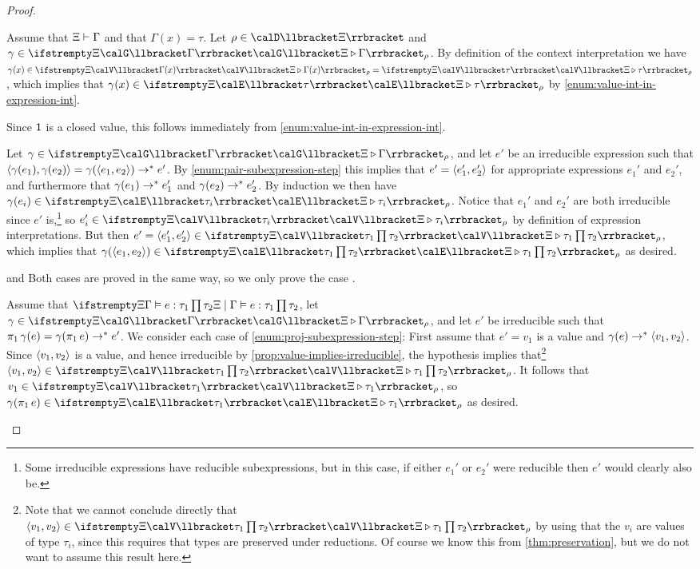 \begin{proof}
\begin{proofsec*}
    \item[\ruleref{Tvar}]
    Assume that $\Xi \vdash \Gamma$ and that $\Gamma(x) = \tau$. Let $\rho \in \tvarInt{\Xi}$ and $\gamma \in \conInt{\Xi}{\Gamma}{\rho}$. By definition of the context interpretation we have $\gamma(x) \in \valInt{\Xi}{\Gamma(x)}{\rho} = \valInt{\Xi}{\tau}{\rho}$, which implies that $\gamma(x) \in \expInt{\Xi}{\tau}{\rho}$ by \cref{enum:value-int-in-expression-int}.

    \item[\ruleref{Tunit}]
    Since $\mathsf{1}$ is a closed value, this follows immediately from \cref{enum:value-int-in-expression-int}.

    \item[\ruleref{Tpair}]
    Let $\gamma \in \conInt{\Xi}{\Gamma}{\rho}$, and let $e'$ be an irreducible expression such that $\langle\textcolor{black}{\gamma(e_1)},\textcolor{black}{\gamma(e_2)}\rangle = \gamma(\langle\textcolor{black}{e_1},\textcolor{black}{e_2}\rangle) \to^* e'$. By \cref{enum:pair-subexpression-step} this implies that $e' = \langle\textcolor{black}{e_1'},\textcolor{black}{e_2'}\rangle$ for appropriate expressions $e_1'$ and $e_2'$, and furthermore that $\gamma(e_1) \to^* e_1'$ and $\gamma(e_2) \to^* e_2'$. By induction we then have $\gamma(e_i) \in \expInt{\Xi}{\tau_i}{\rho}$. Notice that $e_1'$ and $e_2'$ are both irreducible since $e'$ is,\footnote{Some irreducible expressions have reducible subexpressions, but in this case, if either $e_1'$ or $e_2'$ were reducible then $e'$ would clearly also be.} so $e_i' \in \valInt{\Xi}{\tau_i}{\rho}$ by definition of expression interpretations. But then $e' = \expPair{e_1'}{e_2'} \in \valInt{\Xi}{\typeProd{\tau_1}{\tau_2}}{\rho}$, which implies that $\gamma(\expPair{e_1}{e_2}) \in \expInt{\Xi}{\typeProd{\tau_1}{\tau_2}}{\rho}$ as desired.

    \item[\ruleref{Tprojl} and \ruleref{Tprojr}]
    Both cases are proved in the same way, so we only prove the case .

    Assume that $\semtype{\Xi}{\Gamma}{e}{\typeProd{\tau_1}{\tau_2}}$, let $\gamma \in \conInt{\Xi}{\Gamma}{\rho}$, and let $e'$ be irreducible such that $\expProjl{\gamma(e)} = \gamma(\expProjl{e}) \step^* e'$. We consider each case of \cref{enum:proj-subexpression-step}: First assume that $e' = v_1$ is a value and $\gamma(e) \to^* \langle\textcolor{black}{v_1},\textcolor{black}{v_2}\rangle$. Since $\langle\textcolor{black}{v_1},\textcolor{black}{v_2}\rangle$ is a value, and hence irreducible by \cref{prop:value-implies-irreducible}, the hypothesis implies that\footnote{Note that we cannot conclude directly that $\expPair{v_1}{v_2} \in \valInt{\Xi}{\typeProd{\tau_1}{\tau_2}}{\rho}$ by using that the $v_i$ are values of type $\tau_i$, since this requires that types are preserved under reductions. Of course we know this from \cref{thm:preservation}, but we do not want to assume this result here.} $\expPair{v_1}{v_2} \in \valInt{\Xi}{\typeProd{\tau_1}{\tau_2}}{\rho}$. It follows that $v_1 \in \valInt{\Xi}{\tau_1}{\rho}$, so $\gamma(\expProjl{e}) \in \expInt{\Xi}{\tau_1}{\rho}$ as desired.
    

\end{proofsec*}
\end{proof}
